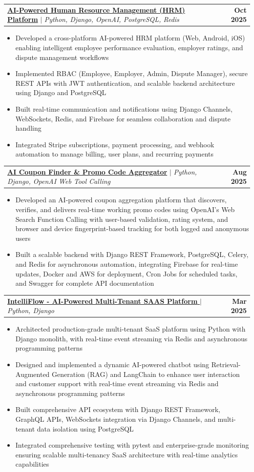 \documentclass[letterpaper,11pt]{article}
\makeatletter
\newcommand{\resumeItem}[1]{
  \item\small{
    {#1 \vspace{-2pt}}
  }
}
\newcommand{\resumeProjectHeading}[2]{
    \item
    \begin{tabular*}{1.001\textwidth}{l@{\extracolsep{\fill}}r}
      \small#1 & \textbf{\small #2}\\
    \end{tabular*}\vspace{-7pt}
}
\newcommand{\resumeItemListStart}{\begin{itemize}}
\newcommand{\resumeItemListEnd}{\end{itemize}\vspace{-5pt}}
\makeatother
\begin{document}
\resumeProjectHeading
    {\href{https://your-project-url.com}{\textbf{AI-Powered Human Resource Management (HRM) Platform}} $|$ \emph{Python, Django, OpenAI, PostgreSQL, Redis}}{Oct 2025}
\resumeItemListStart
    \resumeItem{Developed a cross-platform AI-powered HRM platform (Web, Android, iOS) enabling intelligent employee performance evaluation, employer ratings, and dispute management workflows}
    \resumeItem{Implemented RBAC (Employee, Employer, Admin, Dispute Manager), secure REST APIs with JWT authentication, and scalable backend architecture using Django and PostgreSQL}
    \resumeItem{Built real-time communication and notifications using Django Channels, WebSockets, Redis, and Firebase for seamless collaboration and dispute handling}
    \resumeItem{Integrated Stripe subscriptions, payment processing, and webhook automation to manage billing, user plans, and recurring payments}
\resumeItemListEnd
\vspace{-13pt}


\resumeProjectHeading
    {\href{https://ai-coupon-finder.dev.crymzee.com/}{\textbf{AI Coupon Finder \& Promo Code Aggregator}} $|$ \emph{Python, Django, OpenAI Web  Tool Calling}}{Aug 2025 }
\resumeItemListStart
 \resumeItem{Developed an AI-powered coupon aggregation platform that discovers, verifies, and delivers real-time working promo codes using OpenAI’s Web Search Function Calling with user-based validation, rating system, and browser and device fingerprint-based tracking for both logged and anonymous users}
\resumeItem{Built a scalable backend with Django REST Framework, PostgreSQL, Celery, and Redis for asynchronous automation, integrating Firebase for real-time updates, Docker and AWS for deployment, Cron Jobs for scheduled tasks, and Swagger for complete API documentation}

\resumeItemListEnd
\vspace{-13pt}

\resumeProjectHeading
    {\href{https://github.com/rizzikhan}{\textbf{IntelliFlow - AI-Powered Multi-Tenant SAAS Platform }} $|$ \emph{Python, Django}}{Mar 2025}
\resumeItemListStart
    \resumeItem{Architected production-grade multi-tenant SaaS platform using Python with Django monolith, with real-time event streaming via Redis and asynchronous programming patterns}
    \resumeItem{Designed and implemented a dynamic AI-powered chatbot using Retrieval-Augmented Generation (RAG) and LangChain to enhance user interaction and customer support with real-time event streaming via Redis and asynchronous programming patterns}
    \resumeItem{Built comprehensive API ecosystem with Django REST Framework, GraphQL APIs, WebSockets integration via Django Channels, and multi-tenant data isolation using PostgreSQL}
    \resumeItem{Integrated comprehensive testing with pytest and enterprise-grade monitoring ensuring scalable multi-tenancy SaaS architecture with real-time analytics capabilities}
\resumeItemListEnd
\vspace{-13pt}
\end{document}
